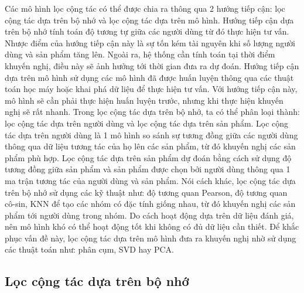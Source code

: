 Các mô hình lọc cộng tác có thể được chia ra thông qua 2 hướng tiếp cận: lọc cộng tác dựa trên bộ nhớ và 
lọc cộng tác dựa trên mô hình. Hướng tiếp cận dựa trên bộ nhớ tính toán độ
tương tự giữa các người dùng từ đó thực hiện tư vấn. Nhược điểm của hướng tiếp
cận này là sự tốn kém tài nguyên khi số lượng người dùng và sản phẩm tăng lên. Ngoài ra, hệ 
thống cần tính toán tại thời điểm khuyến nghị, điều này sẽ ảnh hưởng tới thời gian đưa ra dự đoán.
Hướng tiếp cận dựa trên mô hình sử dụng các mô hình đã được huấn luyện thông
qua các thuật toán học máy hoặc khai phá dữ liệu để thực hiện tư vấn. Với hướng tiếp cận này, 
mô hình sẽ cần phải thực hiện huấn luyện trước, nhưng khi thực hiện khuyến nghị sẽ rất nhanh. 
Trong lọc cộng tác dựa trên bộ nhớ, ta có thể phân loại thành: 
lọc cộng tác dựa trên người dùng và lọc cộng tác dựa trên sản phẩm. Lọc cộng tác dựa trên người dùng là 
1 mô hình so sánh sự tương đồng giữa các người dùng thông qua dữ liệu tương tác của họ lên 
các sản phẩm, từ đó khuyến nghị các sản phẩm phù hợp. Lọc cộng tác dựa trên sản phẩm dự 
đoán bằng cách sử dụng độ tương đồng giữa sản phẩm và sản phẩm được chọn bởi người dùng 
thông qua 1 ma trận tương tác của người dùng và sản phẩm. Nói cách khác, lọc cộng tác dựa 
trên bộ nhớ sử dụng các kỹ thuật như: độ tương quan Pearson, độ tương quan cô-sin, KNN 
để tạo các nhóm có đặc tính giống nhau, từ đó khuyến nghị các sản phẩm tới người dùng trong 
nhóm. Do cách hoạt động dựa trên dữ liệu đánh giá, nên mô hình khó có thể hoạt động tốt 
khi không có đủ dữ liệu cần thiết. Để khắc phục vấn đề này, lọc cộng tác dựa trên mô hình 
đưa ra khuyến nghị nhờ sử dụng các thuật toán như: phân cụm, SVD hay PCA.

\subsection{Lọc cộng tác dựa trên bộ nhớ}

